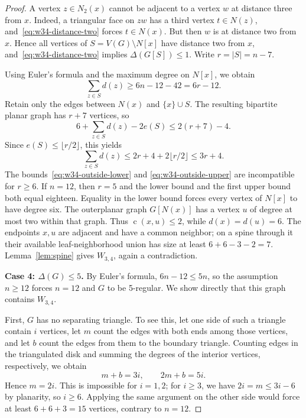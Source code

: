 \documentclass[11pt,a4paper]{article}
\theoremstyle{remark}
\newcommand{\cdeg}{\operatorname{c}}
\begin{document}
\begin{proof}
A vertex $z\in N_2(x)$ cannot be adjacent to a vertex $w$ at
distance three from $x$. Indeed, a triangular face on $zw$ has a
third vertex $t\in N(z)$, and~\eqref{eq:w34-distance-two} forces
$t\in N(x)$. But then $w$ is at distance two from $x$. Hence all
vertices of $S=V(G)\setminus N[x]$ have distance two from $x$,
and~\eqref{eq:w34-distance-two} implies $\Delta(G[S])\le1$.
Write $r=|S|=n-7$.

Using Euler's formula and the maximum degree on $N[x]$, we obtain
\begin{equation}\label{eq:w34-outside-lower}
\sum_{z\in S}d(z)\ge6n-12-42=6r-12.
\end{equation}
Retain only the edges between $N(x)$ and $\{x\}\cup S$. The
resulting bipartite planar graph has $r+7$ vertices, so
\[
6+\sum_{z\in S}d(z)-2e(S)\le2(r+7)-4.
\]
Since $e(S)\le\lfloor r/2\rfloor$, this yields
\begin{equation}\label{eq:w34-outside-upper}
\sum_{z\in S}d(z)\le2r+4+2\lfloor r/2\rfloor\le3r+4.
\end{equation}
The bounds~\eqref{eq:w34-outside-lower} and
\eqref{eq:w34-outside-upper} are incompatible for $r\ge6$.
If $n=12$, then $r=5$ and the lower bound and the first upper
bound both equal eighteen. Equality in the lower bound forces
every vertex of $N[x]$ to have degree six. The outerplanar graph
$G[N(x)]$ has a vertex $u$ of degree at most two within that
graph. Thus $\cdeg(x,u)\le2$, while $d(x)=d(u)=6$. The endpoints
$x,u$ are adjacent and have a common neighbor; on a spine
through it their available leaf-neighborhood union has size at
least $6+6-3-2=7$. Lemma~\ref{lem:spine} gives $W_{3,4}$,
again a contradiction.

\medskip\noindent
\textbf{Case 4: $\Delta(G)\le5$.}
By Euler's formula, $6n-12\le5n$, so the assumption $n\ge12$
forces $n=12$ and $G$ to be 5-regular. We show directly that
this graph contains $W_{3,4}$.

First, $G$ has no separating triangle. To see this, let one side
of such a triangle contain $i$ vertices, let $m$ count the edges
with both ends among those vertices, and let $b$ count the edges
from them to the boundary triangle. Counting edges in the triangulated disk
and summing the degrees of the interior vertices, respectively, we obtain
\[
m+b=3i,\qquad 2m+b=5i.
\]
Hence $m=2i$. This is impossible for $i=1,2$; for $i\ge3$,
we have $2i=m\le3i-6$ by planarity, so $i\ge6$. Applying the same
argument on the other side would force at least $6+6+3=15$
vertices, contrary to $n=12$.


\end{proof}
\end{document}
